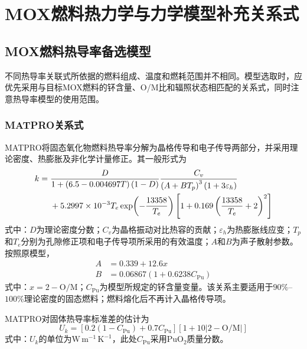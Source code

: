 \chapter{MOX燃料热力学与力学模型补充关系式}
\label{app:mox_supplementary_models}

\section{MOX燃料热导率备选模型}
\label{app:mox_thermal_conductivity_models}

不同热导率关联式所依据的燃料组成、温度和燃耗范围并不相同。模型选取时，应优先采用与目标MOX燃料的钚含量、O/M比和辐照状态相匹配的关系式，同时注意热导率模型的使用范围。

\subsection{MATPRO关系式}

MATPRO将固态氧化物燃料热导率分解为晶格传导和电子传导两部分，并采用理论密度、热膨胀及非化学计量修正。其一般形式为
\begin{align}
	k={}&
	\frac{D}{1+\left(6.5-0.004697T\right)(1-D)}
	\frac{C_v}{\left(A+BT_p\right)^3\left(1+3\varepsilon_h\right)}
	\notag\\
	&+5.2997\times10^{-3}T_e
	\exp\!\left(-\frac{13358}{T_e}\right)
	\left[
	1+0.169\left(\frac{13358}{T_e}+2\right)^2
	\right]
	\label{eq:appendix_matpro_thermal_conductivity}
\end{align}
\noindent 式中：$D$为理论密度分数；$C_v$为晶格振动对比热容的贡献；$\varepsilon_h$为热膨胀线应变；$T_p$和$T_e$分别为孔隙修正项和电子传导项所采用的有效温度；$A$和$B$为声子散射参数。按照原模型，
\begin{equation}
	\begin{aligned}
		A&=0.339+12.6x\\
				B&=0.06867\left(1+0.6238C_{\mathrm{Pu}}\right)
	\end{aligned}
	\label{eq:appendix_matpro_scattering_parameters}
\end{equation}
\label{eq:appendix_matpro_A}
\label{eq:appendix_matpro_B}
\noindent 式中：$x=2-\mathrm{O/M}$；$C_{\mathrm{Pu}}$为模型所规定的钚含量变量。该关系主要适用于$90\%$--$100\%$理论密度的固态燃料；燃料熔化后不再计入晶格传导项。

MATPRO对固体热导率标准差的估计为
\begin{equation}
	U_k=
	\left[0.2(1-C_{\mathrm{Pu}})+0.7C_{\mathrm{Pu}}\right]
	\left[1+10\left|2-\mathrm{O/M}\right|\right]
	\label{eq:appendix_matpro_thermal_conductivity_uncertainty}
\end{equation}
\noindent 式中：$U_k$的单位为$\mathrm{W\,m^{-1}\,K^{-1}}$，此处$C_{\mathrm{Pu}}$采用$\mathrm{PuO}_2$质量分数。

